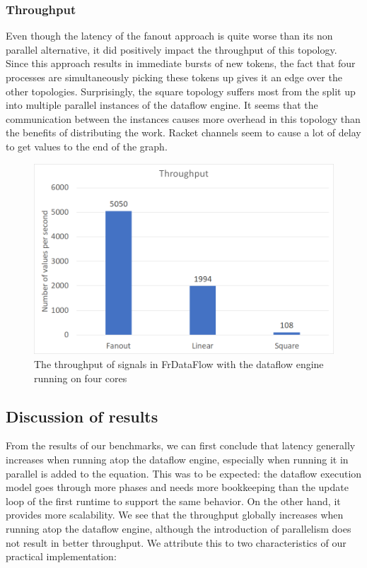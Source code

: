 \subsubsection{Throughput}

Even though the latency of the fanout approach is quite worse than its non parallel alternative, it did positively impact the throughput of this topology. Since this approach results in immediate bursts of new tokens, the fact that four processes are simultaneously picking these tokens up gives it an edge over the other topologies. 
Surprisingly, the square topology suffers most from the split up into multiple parallel instances of the dataflow engine. It seems that the communication between the instances causes more overhead in this topology than the benefits of distributing the work. Racket channels seem to cause a lot of delay to get values to the end of the graph. 

\begin{figure}[ht]
	\includegraphics[width=\textwidth]{images/Evaluation-WithDataFlowParallel-Throughput.png}
	\caption{The throughput of signals in FrDataFlow with the dataflow engine running on four cores}
	\label{fig:evaluation-withdataflow-throughput}
\end{figure}

\subsection{Discussion of results}

From the results of our benchmarks, we can first conclude that latency generally increases when running atop the dataflow engine, especially when running it in parallel is added to the equation. This was to be expected: the dataflow execution model goes through more phases and needs more bookkeeping than the update loop of the first runtime to support the same behavior. On the other hand, it provides more scalability. We see that the throughput globally increases when running atop the dataflow engine, although the introduction of parallelism does not result in better throughput. We attribute this to two characteristics of our practical implementation:

